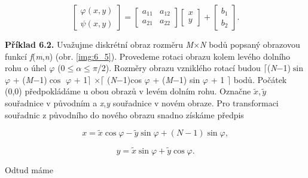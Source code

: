 \begin{equation} \label{eq:6_25}
    \left[\begin{array}{c} {\varphi \left(x,y\right)} \\ {\psi \left(x,y\right)} \end{array}\right]=\left[\begin{array}{cc} {a_{11} } & {a_{12} } \\ {a_{21} } & {a_{22} } \end{array}\right]\left[\begin{array}{c} {x} \\ {y} \end{array}\right]+\left[\begin{array}{c} {b_{1} } \\ {b_{2} } \end{array}\right].  
\end{equation}

\noindent \textbf{Příklad 6.2.} Uvažujme diskrétní obraz rozměru \textit{M}$\times$\textit{N} bodů popsaný obrazovou funkcí \textit{f}(\textit{m},\textit{n}) (obr. \ref{img:6_5}). Provedeme rotaci obrazu kolem levého dolního rohu o úhel $\varphi$ (0$\leq$$\alpha$$\leq$$\pi$/2). Rozměry obrazu vzniklého rotací budou $\lceil$(\textit{N}$-$1)$\sin$ $\varphi$ + (\textit{M}$-$1)$\cos$ $\varphi$ + 1$\rceil$ $\times \lceil$ (\textit{N}$-$1)cos $\varphi$ + (\textit{M}$-$1) sin $\varphi$ + 1 $\rceil$ bodů. Počátek (0,0) předpokládáme u obou obrazů v levém dolním rohu. Označne $\tilde{x},\tilde{y}$ souřadnice v původním a \textit{x},\textit{y} souřadnice v novém obraze. Pro transformaci souřadnic z původního do nového obrazu snadno získáme předpis

\begin{equation}
    x = \tilde{x}\cos \varphi -\tilde{y}\sin \varphi +(N-1) \sin \varphi, \nonumber
\end{equation}

\begin{equation}
    y = \tilde{x}\sin \varphi +\tilde{y}\cos \varphi. \nonumber 
\end{equation}

Odtud máme

